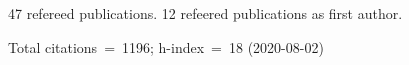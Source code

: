 47 refereed publications. 12 refeered publications as first author.

Total citations~=~1196; h-index~=~18 (2020-08-02)